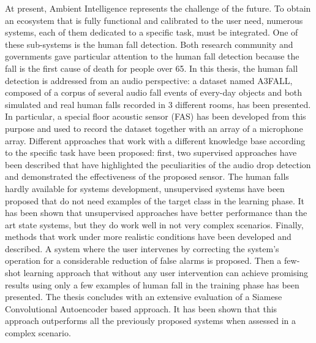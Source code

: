 \documentclass[a4print,english,lof,lot]{univpmphdthesis}
\begin{document}
\frontmatter

\maketitle



\begin{thesisabstract}
At present, Ambient Intelligence represents the challenge of the future. To obtain an ecosystem that is fully functional and calibrated to the user need, numerous systems, each of them dedicated to a specific task, must be integrated. One of these sub-systems is the human fall detection. Both research community and governments gave particular attention to the human fall detection because the fall is the first cause of death for people over 65. In this thesis, the human fall detection is addressed from an audio perspective: a dataset named A3FALL, composed of a corpus of several audio fall events of every-day objects and both simulated and real human falls recorded in 3 different rooms, has been presented. In particular, a special floor acoustic sensor (FAS) has been developed from this purpose and used to record the dataset together with an array of a microphone array.
Different approaches that work with a different knowledge base according to the specific task have been proposed: first, two supervised approaches have been described that have highlighted the peculiarities of the audio drop detection and demonstrated the effectiveness of the proposed sensor.
The human falls hardly available for systems development, unsupervised systems have been proposed that do not need examples of the target class in the learning phase. It has been shown that unsupervised approaches have better performance than the art state systems, but they do work well in not very complex scenarios.
Finally, methods that work under more realistic conditions have been developed and described. A system where the user intervenes by correcting the system's operation for a considerable reduction of false alarms is proposed. Then a few-shot learning approach that without any user intervention can achieve promising results using only a few examples of human fall in the training phase has been presented. The thesis concludes with an extensive evaluation of a Siamese Convolutional Autoencoder based approach. It has been shown that this approach outperforms all the previously proposed systems when assessed in a complex scenario.
\end{thesisabstract}
\end{document}
